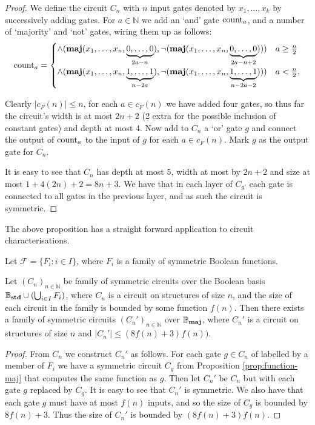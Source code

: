 \documentclass[../paper.tex]{subfiles}
\begin{document}
\begin{proof}
  We define the circuit $C_n$ with $n$ input gates denoted by $x_1, \ldots, x_k$
  by successively adding gates. For $a \in \mathbb{N}$ we add an `and' gate
  $\text{count}_a$, and a number of `majority' and `not' gates, wiring them up as
  follows:
  \[
    \text{count}_a = \begin{cases} \land ( \text{\textbf{maj}} ( x_1, \ldots, x_n, \underbrace
      {0, \ldots, 0}_{2a - n} ), \neg ( \text{\textbf{maj}} (x_1, \ldots , x_n, \underbrace{0,
        \ldots,
        0}_{2a - n + 2} ) )) &  a \geq \frac{n}{2} \\
      \land ( \text{\textbf{maj}} ( x_1, \ldots, x_n, \underbrace {1, \ldots, 1}_{n - 2a} ),
      \neg ( \text{\textbf{maj}} ( x_1, \ldots , x_n, \underbrace{1, \ldots, 1}_{n - 2a -2} )
      )) & a < \frac{n}{2}.
    \end{cases}
  \]
  
  Clearly $\vert c_F(n) \vert \leq n$, for each $a \in c_F(n)$ we have added
  four gates, so thus far the circuit's width is at most $2n + 2$ (2 extra for
  the possible inclusion of constant gates) and depth at most $4$. Now add to
  $C_n$ a `or' gate $g$ and connect the output of $\text{count}_a$ to the input of
  $g$ for each $a \in c_F(n)$. Mark $g$ as the output gate for $C_n$.

  It is easy to see that $C_n$ has depth at most $5$, width at most by $2n + 2$
  and size at most $1 + 4(2n) + 2 = 8n+3$. We have that in each layer of
  $C_{g'}$ each gate is connected to all gates in the previous layer, and as
  such the circuit is symmetric.
\end{proof}

The above proposition has a straight forward application to circuit
characterisations.

\begin{thm}
  Let $\mathcal{F} = \{F_i : i \in I \}$, where $F_i$ is a family of symmetric
  Boolean functions.
  
  Let $(C_n)_{n \in \mathbb{N}}$ be family of symmetric circuits over the
  Boolean basis $\mathbb{B}_{\text{\textbf{std}}} \cup (\bigcup_{i \in I} F_i)$, where $C_n$ is
  a circuit on structures of size $n$, and the size of each circuit in the
  family is bounded by some function $f(n)$. Then there exists a family of
  symmetric circuits $(C_n')_{n \in \mathbb{N}}$ over $\mathbb{B}_{\text{\textbf{maj}}}$, where
  $C_n'$ is a circuit on structures of size $n$ and $\vert C_n' \vert \leq
  (8f(n) + 3) f(n))$.
\end{thm}

\begin{proof}
  From $C_n$ we construct $C_n'$ as follows. For each gate $g \in C_n$ of
  labelled by a member of $F_i$ we have a symmetric circuit $C_g$ from
  Proposition \ref{prop:function-maj} that computes the same function as $g$.
  Then let $C_n'$ be $C_n$ but with each gate $g$ replaced by $C_g$. It is easy
  to see that $C_n'$ is symmetric. We also have that each gate $g$ must have at
  most $f(n)$ inputs, and so the size of $C_g$ is bounded by $8f(n) + 3$. Thus
  the size of $C_n'$ is bounded by $(8f(n)+3) f(n)$.
\end{proof}
\end{document}

